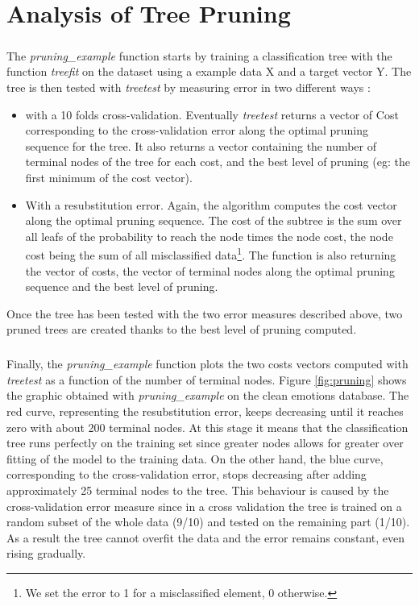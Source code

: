 \documentclass[a4paper,12pt,oneside,final]{report}
\begin{document}
\chapter{Analysis of Tree Pruning}
\paragraph{}
The \textit{pruning\_example} function starts by training a classification tree with the function \textit{treefit} on the dataset using a example data X and a target vector Y. The tree is then tested with \textit{treetest} by measuring error in two different ways :
\begin{itemize}
\item with a 10 folds cross-validation. Eventually \textit{treetest} returns a vector of Cost corresponding to the cross-validation error along the optimal pruning sequence for the tree. It also returns a vector containing the number of terminal nodes of the tree for each cost, and the best level of pruning (eg: the first minimum of the cost vector).
\item With a resubstitution error. Again, the algorithm computes the cost vector along the optimal pruning sequence. The cost of the subtree is the sum over all leafs of the probability to reach the node times the node cost, the node cost being the sum of all misclassified data\footnote{We set the error to 1 for a misclassified element, 0 otherwise.}.
The function is also returning the vector of costs, the vector of terminal nodes along the optimal pruning sequence and the best level of pruning.
\end{itemize}
Once the tree has been tested with the two error measures described above, two pruned trees are created thanks to the best level of pruning computed.
\paragraph{}
Finally, the \textit{pruning\_example} function plots the two costs vectors computed with \textit{treetest} as a function of the number of terminal nodes. Figure \ref{fig:pruning} shows the graphic obtained with \textit{pruning\_example} on the clean emotions database. 
The red curve, representing the resubstitution error, keeps decreasing until it reaches zero with about 200 terminal nodes. At this stage it means that the classification tree runs perfectly on the training set since greater nodes allows for greater over fitting of the model to the training data. On the other hand, the blue curve, corresponding to the cross-validation error, stops decreasing after adding approximately 25 terminal nodes to the tree. This behaviour is caused by the cross-validation error measure since in a cross validation the tree is trained on a random subset of the whole data (9/10) and tested on the remaining part (1/10). As a result the tree cannot overfit the data and the error remains constant, even rising gradually.
\end{document}
